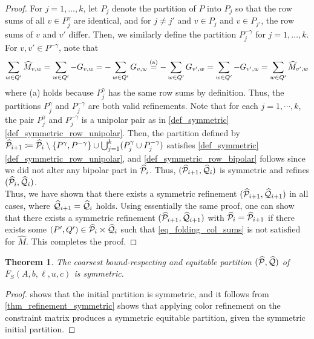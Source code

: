 \documentclass[pdflatex,sn-mathphys-num]{sn-jnl}%
\theoremstyle{thmstyleone}%
\newtheorem{theorem}[theorem]{Theorem}
\theoremstyle{thmstylethree}%
\theoremstyle{thmstyletwo}%
\begin{document}
\begin{proof}
    For $j=1,\dotsc,k$, let $P_j$ denote the partition of $P$ into $P_j$ so that the row sums of all $v\in P^\gamma_j$ are identical, and for $j\neq j'$ and $v\in P_j$ and $v\in P_{j'}$, the row sums of $v$ and $v'$ differ. Then, we similarly define the partition $P^{-\gamma}_j$ for $j=1,\dotsc,k$. For $v,v'\in P^{-\gamma}$, note that
    \begin{equation*}
        \sum_{w\in Q'} \widehat{M}_{v,w} = \sum_{w\in Q'} -G_{v,w} = - \sum_{w\in Q'} G_{v,w} \stackrel{\textup{(a)}}{=} - \sum_{w\in Q'} G_{v',w} =  \sum_{w\in Q'} -G_{v',w} = \sum_{w\in Q'} \widehat{M}_{v',w}
    \end{equation*} where \textup{(a)} holds because $P^\gamma_j$ has the same row sums by definition. Thus, the partitions $P^\gamma_j$ and $P^{-\gamma}_j$ are both valid refinements. Note that for each $j=1,\cdots,k$, the pair $P^\gamma_j$ and $P^{-\gamma}_j$ is a unipolar pair as in \cref{def_symmetric}\ref{def_symmetric_row_unipolar}. Then, the partition defined by $\widehat{\MP}_{i+1} \coloneqq \widehat{\MP}_{i}\setminus \{P^\gamma, P^{-\gamma}\} \cup \bigcup_{j=1}^k (P^\gamma_j\cup P^{-\gamma}_j)$ satisfies \cref{def_symmetric}\ref{def_symmetric_row_unipolar}, and \ref{def_symmetric_row_bipolar} follows since we did not alter any bipolar part in $\widehat{\mathcal{P}}_i$. Thus, $(\widehat{\mathcal{P}}_{i+1},\widehat{\mathcal{Q}}_i)$ is symmetric and refines $(\widehat{\mathcal{P}}_i,\widehat{\mathcal{Q}}_i)$.\\
    

    Thus, we have shown that there exists a symmetric refinement $(\widehat{\mathcal{P}}_{i+1}, \widehat{\mathcal{Q}}_{i+1})$ in all cases, where $\widehat{\mathcal{Q}}_{i+1} = \widehat{\mathcal{Q}}_i$ holds. Using essentially the same proof, one can show that there exists a symmetric refinement $(\widehat{\mathcal{P}}_{i+1},\widehat{\mathcal{Q}}_{i+1})$ with $\widehat{\mathcal{P}}_i = \widehat{\mathcal{P}}_{i+1}$ if there exists some $(P',Q')\in \widehat{\mathcal{P}}_i\times \widehat{\mathcal{Q}}_i$ such that \eqref{eq_folding_col_sums} is not satisfied for $\widehat{M}$. This completes the proof.
\end{proof}

\begin{theorem}
    \label{thm_lp_symmetric}
    The coarsest bound-respecting and equitable partition $(\widehat{\mathcal{P}},\widehat{\mathcal{Q}})$ of $F_S(A,b,\ell,u,c)$ is symmetric.
\end{theorem}
\begin{proof}
     shows that the initial partition is symmetric, and it follows from \cref{thm_refinement_symmetric} shows that applying color refinement on the constraint matrix produces a symmetric equitable partition, given the symmetric initial partition.
\end{proof}
\end{document}
